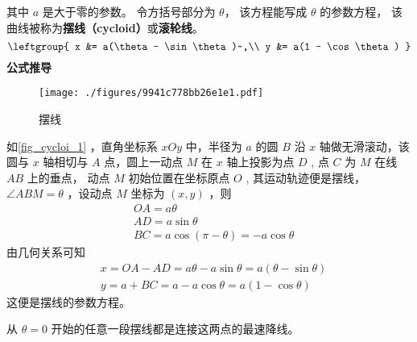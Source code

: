 
\begin{issues}
\issueDraft
\end{issues}

其中 $a$ 是大于零的参数。 令方括号部分为 $\theta$， 该方程能写成 $\theta$ 的参数方程， 该曲线被称为\textbf{摆线（cycloid）}或\textbf{滚轮线}。 %
\begin{equation}
\leftgroup{
x &= a(\theta - \sin\theta)~,\\
y &= a(1 - \cos\theta)
}\end{equation}
\textbf{公式推导}
\begin{figure}[ht]
\centering
\texttt{[image: ./figures/9941c778bb26e1e1.pdf]}
\caption{摆线} \label{fig_cycloi_1}
\end{figure}
如\autoref{fig_cycloi_1} ，直角坐标系 $xOy$ 中，半径为 $a$ 的圆 $B$ 沿 $x$ 轴做无滑滚动，该圆与 $x$ 轴相切与 $A$ 点，圆上一动点 $M$ 在 $x$ 轴上投影为点 $D$ , 点 $C$ 为 $M$ 在线 $AB$ 上的垂点， 动点 $M$ 初始位置在坐标原点 $O$ , 其运动轨迹便是摆线， $\angle ABM=\theta$ ，设动点 $M$ 坐标为 $(x,y)$ ，则
\begin{equation}
\begin{aligned}
&OA=a\theta \\
&AD=a\sin\theta\\
&BC=a\cos(\pi-\theta)=-a \cos\theta
\end{aligned}
\end{equation}
由几何关系可知
\begin{equation}
\begin{aligned}
&x=OA-AD=a\theta-a\sin\theta=a(\theta-\sin\theta)\\
&y=a+BC=a-a\cos\theta=a(1-\cos\theta)
\end{aligned}
\end{equation}
这便是摆线的参数方程。


从 $\theta = 0$ 开始的任意一段摆线都是连接这两点的最速降线。 
